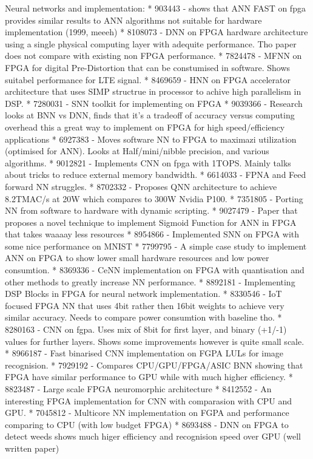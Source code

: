 Neural networks and implementation:
* 903443 - shows that ANN FAST on fpga provides similar results to ANN algorithms not suitable for hardware implementation (1999, meeeh)
* 8108073 - DNN on FPGA hardware architecture using a single physical computing layer with adequite performance. Tho paper does not compare with existing non FPGA performance.
* 7824478 - MFNN on FPGA for digital Pre-Distortion that can be constumised in software. Shows suitabel performance for LTE signal.
* 8469659 - HNN on FPGA accelerator architecture that uses SIMP structrue in processor to achive high parallelism in DSP.
* 7280031 - SNN toolkit for implementing on FPGA
* 9039366 - Research looks at BNN vs DNN, finds that it's a tradeoff of accuracy versus computing overhead this a great way to implement on FPGA for high speed/efficiency applications
* 6927383 - Moves software NN to FPGA to maximazi utilization (optimised for ANN). Looks at Half/mini/nibble precision, and various algorithms.
* 9012821 - Implements CNN on fpga with 1TOPS. Mainly talks about tricks to reduce external memory bandwidth.
* 6614033 - FPNA and Feed forward NN struggles.
* 8702332 - Proposes QNN architecture to achieve 8.2TMAC/s at 20W which compares to 300W Nvidia P100.
* 7351805 - Porting NN from software to hardware with dynamic scripting.
* 9027479 - Paper that proposes a novel technique to implement Sigmoid Function for ANN in FPGA that takes waaaay less resources
* 8954866 - Implemented SNN on FPGA with some nice performance on MNIST
* 7799795 - A simple case study to implement ANN on FPGA to show lower small hardware resources and low power consumtion.
* 8369336 - CeNN implementation on FPGA with quantisation and other methods to greatly increase NN performance.
* 8892181 - Implementing DSP Blocks in FPGA for neural network implementation.
* 8330546 - IoT focused FPGA NN that uses 4bit rather then 16bit weights to achieve very similar accuracy. Needs to compare power consumtion with baseline tho.
* 8280163 - CNN on fgpa. Uses mix of 8bit for first layer, and binary (+1/-1) values for further layers. Shows some improvements however is quite small scale.
* 8966187 - Fast binarised CNN implementation on FGPA LULs for image recognision.
* 7929192 - Compares CPU/GPU/FPGA/ASIC BNN showing that FPGA have similar performance to GPU while with much higher efficiency.
* 8823487 - Large scale FPGA neuromorphic architecture
* 8412552 - An interesting FPGA implementation for CNN with comparasion with CPU and GPU.
* 7045812 - Multicore NN implementation on FGPA and performance comparing to CPU (with low budget FPGA)
* 8693488 - DNN on FPGA to detect weeds shows much higer efficiency and recognision speed over GPU (well written paper)

